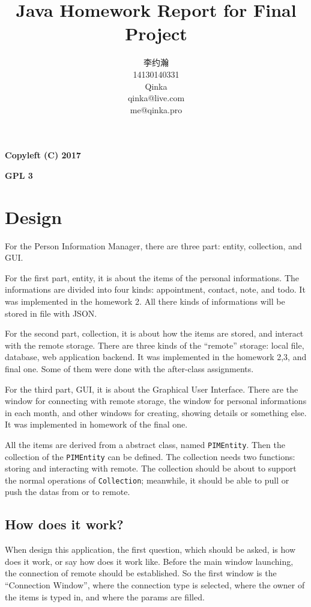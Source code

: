 \documentclass{article}
\title{Java Homework Report for Final Project}
\author{李约瀚 \\ 14130140331 \\ Qinka \\ qinka@live.com \\ me@qinka.pro}
\begin{document}
\maketitle
\newpage

{\Huge \textbf{Copyleft (C) 2017}}
\par
{\Huge \textbf{GPL 3}}
\newpage

\tableofcontents
\newpage

\section{Design}
\label{sec:design}

For the Person Information Manager, there are three part: entity, collection, and GUI.

For the first part, entity, it is about the items of the personal informations. The informations are divided into four kinds: appointment, contact, note, and todo.
It was implemented in the homework 2. All there kinds of informations will be stored in file with JSON.

For the second part, collection, it is about how the items are stored, and interact with the remote storage.
There are three kinds of the ``remote'' storage: local file, database, web application backend.
It was implemented in the homework 2,3, and final one. Some of them were done with the after-class assignments.

For the third part, GUI, it is about the Graphical User Interface. There are the window for connecting with remote storage, the window for personal informations
in each month, and other windows for creating, showing details or something else.
It was implemented in homework of the final one.

All the items are derived from a abstract class, named \lstinline|PIMEntity|. Then the collection of the \lstinline|PIMEntity| can be defined.
The collection needs two functions: storing and interacting with remote. The collection should be about to support the normal operations of \lstinline|Collection|; meanwhile, it should be able to pull or push the datas from or to remote.

\subsection{How does it work?}
\label{sec:design:hiw}

When design this application, the first question, which should be asked, is how does it work, or say how does it work like.
Before the main window launching, the connection of remote should be established. So the first window is the ``Connection Window'',
where the connection type is selected, where the owner of the items is typed in, and where the params are filled.
\end{document}
